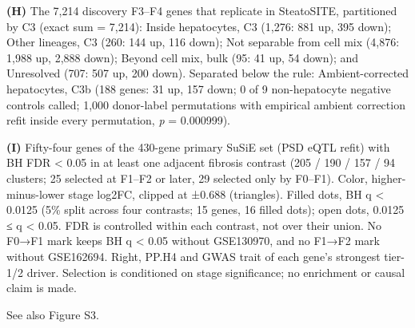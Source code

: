 \textbf{(H)} The 7,214 discovery F3--F4 genes that replicate in SteatoSITE, partitioned by C3 (exact sum = 7,214): Inside hepatocytes, C3 (1,276: 881 up, 395 down); Other lineages, C3 (260: 144 up, 116 down); Not separable from cell mix (4,876: 1,988 up, 2,888 down); Beyond cell mix, bulk (95: 41 up, 54 down); and Unresolved (707: 507 up, 200 down). Separated below the rule: Ambient-corrected hepatocytes, C3b (188 genes: 31 up, 157 down; 0 of 9 non-hepatocyte negative controls called; 1,000 donor-label permutations with empirical ambient correction refit inside every permutation, \emph{p} = 0.000999).

\textbf{(I)} Fifty-four genes of the 430-gene primary SuSiE set (PSD eQTL refit) with BH FDR \textless{} 0.05 in at least one adjacent fibrosis contrast (205 / 190 / 157 / 94 clusters; 25 selected at F1--F2 or later, 29 selected only by F0--F1). Color, higher-minus-lower stage log2FC, clipped at ±0.688 (triangles). Filled dots, BH q \textless{} 0.0125 (5\% split across four contrasts; 15 genes, 16 filled dots); open dots, 0.0125 ≤ q \textless{} 0.05. FDR is controlled within each contrast, not over their union. No F0→F1 mark keeps BH q \textless{} 0.05 without GSE130970, and no F1→F2 mark without GSE162694. Right, PP.H4 and GWAS trait of each gene's strongest tier-1/2 driver. Selection is conditioned on stage significance; no enrichment or causal claim is made.

See also Figure S3.
